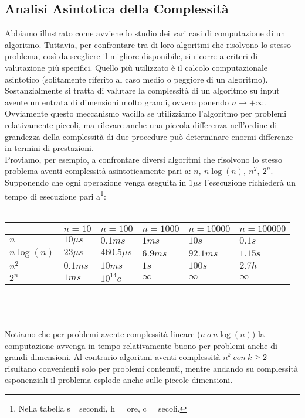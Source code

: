 \subsection{Analisi Asintotica della Complessità}
Abbiamo illustrato come avviene lo studio dei vari casi di computazione di un algoritmo. Tuttavia, per confrontare tra di loro algoritmi che risolvono lo stesso problema, così da scegliere il migliore disponibile, si ricorre a criteri di valutazione più specifici. Quello più utilizzato è il calcolo computazionale asintotico (solitamente riferito al caso medio o peggiore di un algoritmo).\\
Sostanzialmente si tratta di valutare la complessità di un algoritmo su input avente un entrata di dimensioni molto grandi, ovvero ponendo $n \rightarrow +\infty$. Ovviamente questo meccanismo vacilla se utilizziamo l'algoritmo per problemi relativamente piccoli, ma rilevare anche una piccola differenza nell’ordine di grandezza della complessità di due procedure può determinare enormi differenze in termini di prestazioni.\\
Proviamo, per esempio, a confrontare diversi algoritmi che risolvono lo stesso problema aventi complessità asintoticamente pari a: $n, \ n\log(n), \ n^2, \ 2^n$. Supponendo che ogni operazione venga eseguita in $1\mu s$ l'esecuzione richiederà un tempo di esecuzione pari a\footnote{Nella tabella s= secondi, h = ore, c = secoli.}:
\\
\\
\label{my-label}
\begin{tabular}{|l|l|l|l|l|l|}
\hline
			& $n=10$     & $n=100$       	& $n=1000$      & $n=10000$  & $n=100000$  \\   \hline
$n$   		& $10\mu s$  & $0.1 ms$      	&  $1ms$      	& $10s$  	 & $0.1s$      \\	\hline
$n\log(n)$  & $23\mu s$  & $460.5 \mu s$    &  $6.9 ms$     & $92.1 ms$  & $1.15 s$    \\	\hline
$n^2$ 		& $0.1ms$    & $10ms$        	&  $1s$         & $100s$     & $2.7h$      \\	\hline
$2^n$		& $1ms$      & $ 10^{14} c$     &  $\infty$     & $\infty$   & $\infty$    \\   \hline
\end{tabular}
\\ 
\\ 
\\ 
Notiamo che per problemi avente complessità lineare ($n \ o \ n\log(n)$) la computazione avvenga in tempo relativamente buono per problemi anche di grandi dimensioni. Al contrario algoritmi aventi complessità $n^k \ con \ k \geq 2 $ risultano convenienti solo per problemi contenuti, mentre andando su complessità esponenziali il problema esplode anche sulle piccole dimensioni. 
